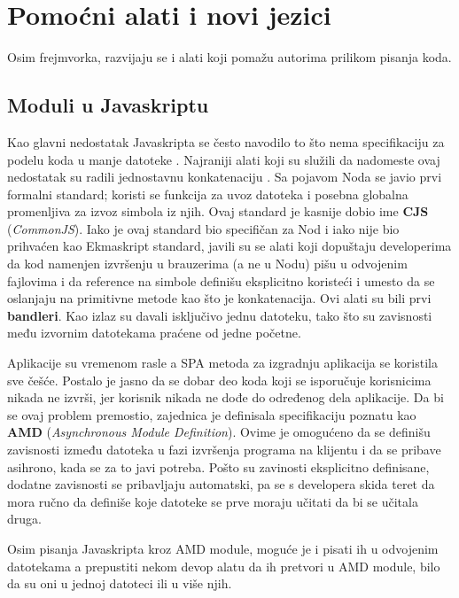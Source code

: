 \section{Pomoćni alati i novi jezici}

Osim frejmvorka, razvijaju se i alati koji pomažu autorima prilikom pisanja koda.

\subsection{Moduli u Javaskriptu}
\label{subsec:js-moduli}

Kao glavni nedostatak Javaskripta se često navodilo to što nema specifikaciju za podelu koda u manje datoteke \cite[\S10]{eloquent-js}.
Najraniji alati koji su služili da nadomeste ovaj nedostatak su radili jednostavnu konkatenaciju \cite{ancienct-concat}.
Sa pojavom Noda se javio prvi formalni standard; koristi se funkcija  za uvoz datoteka i posebna globalna promenljiva  za izvoz simbola iz njih.
Ovaj standard je kasnije dobio ime \textbf{CJS} (\textsl{CommonJS}).
Iako je ovaj standard bio specifičan za Nod i iako nije bio prihvaćen kao Ekmaskript standard, javili su se alati koji dopuštaju developerima da kod namenjen izvršenju u brauzerima (a ne u Nodu) pišu u odvojenim fajlovima i da reference na simbole definišu eksplicitno koristeći  i  umesto da se oslanjaju na primitivne metode kao što je konkatenacija.
Ovi alati su bili prvi \textbf{bandleri}.
Kao izlaz su davali isključivo jednu  datoteku, tako što su zavisnosti među izvornim datotekama praćene od jedne početne.

Aplikacije su vremenom rasle a SPA metoda za izgradnju aplikacija se koristila sve češće.
Postalo je jasno da se dobar deo koda koji se isporučuje korisnicima nikada ne izvrši, jer korisnik nikada ne dođe do određenog dela aplikacije.
Da bi se ovaj problem premostio, zajednica je definisala specifikaciju poznatu kao \textbf{AMD} (\textsl{Asynchronous Module Definition}).
Ovime je omogućeno da se definišu zavisnosti između datoteka u fazi izvršenja programa na klijentu i da se pribave asihrono, kada se za to javi potreba.
Pošto su zavinosti eksplicitno definisane, dodatne zavisnosti se pribavljaju automatski, pa se s developera skida teret da mora ručno da definiše koje datoteke se prve moraju učitati da bi se učitala druga.

Osim pisanja Javaskripta kroz AMD module, moguće je i pisati ih u odvojenim datotekama a prepustiti nekom devop alatu da ih pretvori u AMD module, bilo da su oni u jednoj datoteci ili u više njih.

